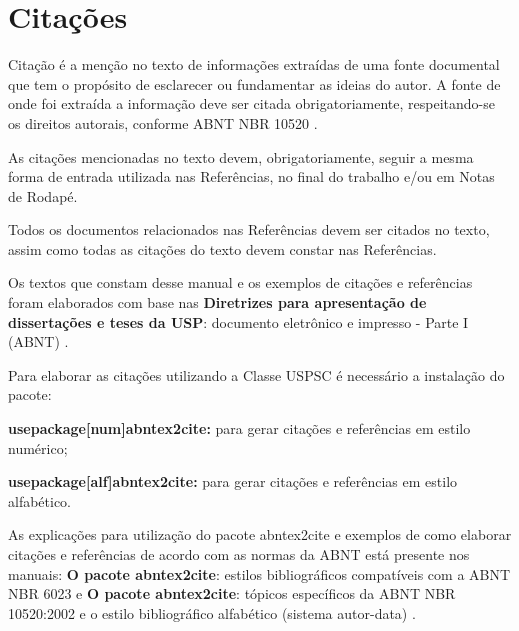 

\chapter{Citações}
\label{Citações}
Citação \'e a menção no texto de informações extraídas de uma fonte documental que tem o propósito de esclarecer ou fundamentar as ideias do autor. A fonte de onde foi extraída a informação deve ser citada obrigatoriamente, respeitando-se os direitos autorais, conforme ABNT NBR 10520 \cite{nbr10520}.

As citações mencionadas no texto devem, obrigatoriamente, seguir a mesma forma de entrada utilizada nas Refer\^encias, no final do trabalho e/ou em Notas de Rodap\'e.

Todos os documentos relacionados nas Refer\^encias devem ser citados no texto, assim como todas as citações do texto devem constar nas Refer\^encias. 

Os textos que constam desse manual e os exemplos de citações e refer\^encias foram elaborados com base nas \textbf{Diretrizes para apresentação de dissertações e teses da USP}: documento eletrônico e impresso - Parte I (ABNT) \cite{sibi2016}.

Para elaborar as citações utilizando a Classe USPSC \'e necess\'ario a instalação do pacote: 

\begin{alineas}
	\item \textbf{usepackage[num]abntex2cite:} para gerar citações e refer\^encias em estilo num\'erico;
	\item \textbf{usepackage[alf]abntex2cite:} para gerar citações e refer\^encias em estilo alfab\'etico.
\end{alineas}

As explicações para utilização do pacote abntex2cite e exemplos de como elaborar citações e refer\^encias de acordo com as normas da ABNT est\'a presente nos manuais: \textbf{O pacote abntex2cite}: estilos bibliogr\'aficos compatíveis com a ABNT NBR 6023 \cite{abnetxcite} e  \textbf{O pacote abntex2cite}: tópicos específicos da ABNT NBR 10520:2002 e o estilo bibliogr\'afico alfab\'etico (sistema autor-data) \cite{abnetxcitealf}.

